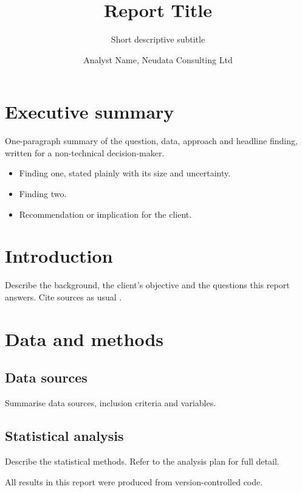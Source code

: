 \documentclass[report]{neudata}
\title{Report Title}
\subtitle{Short descriptive subtitle}
\author{Analyst Name, Neudata Consulting Ltd}
\begin{document}
\maketitle

\tableofcontents
\clearpage

\section*{Executive summary}

One-paragraph summary of the question, data, approach and headline finding, written for a
non-technical decision-maker.

\begin{keyfindings}
  \begin{itemize}
    \item Finding one, stated plainly with its size and uncertainty.
    \item Finding two.
    \item Recommendation or implication for the client.
  \end{itemize}
\end{keyfindings}

\section{Introduction}

Describe the background, the client's objective and the questions this report answers.
Cite sources as usual \parencite{lumley2004}.

\section{Data and methods}

\subsection{Data sources}
Summarise data sources, inclusion criteria and variables.

\subsection{Statistical analysis}
Describe the statistical methods. Refer to the analysis plan for full detail.

\begin{neudatanote}[Reproducibility]
  All results in this report were produced from version-controlled code.
\end{neudatanote}
\end{document}
